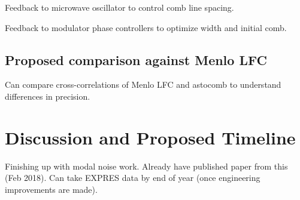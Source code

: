\documentclass[12pt]{article}
\begin{document}
Feedback to microwave oscillator to control comb line spacing.

Feedback to modulator phase controllers to optimize width and initial comb.

\subsection{Proposed comparison against Menlo LFC}

Can compare cross-correlations of Menlo LFC and astocomb to understand differences in precision.

\section{Discussion and Proposed Timeline}

Finishing up with modal noise work. Already have published paper from this (Feb 2018). Can take EXPRES data by end of year (once engineering improvements are made).



\pagebreak



\end{document}

